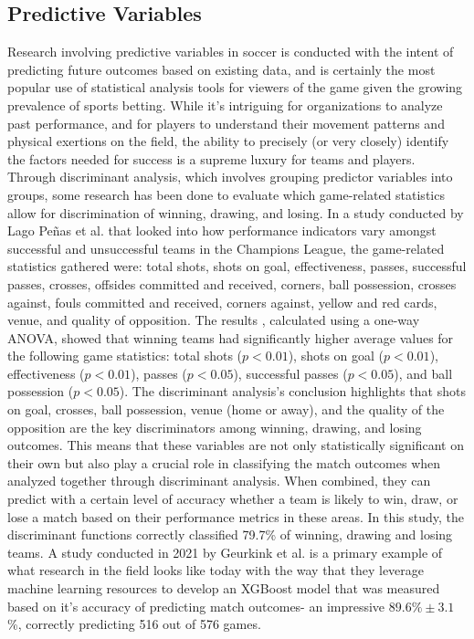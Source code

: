 \subsection{Predictive Variables}

Research involving predictive variables in soccer is conducted with the intent of predicting future outcomes based on existing data, and is certainly the most popular use of statistical analysis tools for viewers of the game given the growing prevalence of sports betting. While it's intriguing for organizations to analyze past performance, and for players to understand their movement patterns and physical exertions on the field, the ability to precisely (or very closely) identify the factors needed for success is a supreme luxury for teams and players. 
Through discriminant analysis, which involves grouping predictor variables into groups, some research has been done to evaluate which game-related statistics allow for discrimination of winning, drawing, and losing. In a study conducted by Lago Peñas et al. that looked into how performance indicators vary amongst successful and unsuccessful teams in the Champions League, the game-related statistics gathered were: total shots, shots on goal, effectiveness, passes, successful passes, crosses, offsides committed and received, corners, ball possession, crosses against, fouls committed and received, corners against, yellow and red cards, venue, and quality of opposition. The results \cite{Lago2011}, calculated using a one-way ANOVA, showed that winning teams had significantly higher average values for the following game statistics: total shots ($p<0.01$), shots on goal ($p<0.01$), effectiveness ($p < 0.01$), passes ($p<0.05$), successful passes ($p<0.05$), and ball possession ($p<0.05$).
The discriminant analysis's conclusion highlights that shots on goal, crosses, ball possession, venue (home or away), and the quality of the opposition are the key discriminators among winning, drawing, and losing outcomes. This means that these variables are not only statistically significant on their own but also play a crucial role in classifying the match outcomes when analyzed together through discriminant analysis. When combined, they can predict with a certain level of accuracy whether a team is likely to win, draw, or lose a match based on their performance metrics in these areas. In this study, the discriminant functions
correctly classified 79.7\% of winning, drawing and losing teams. 
A study conducted in 2021 by Geurkink et al. \cite{Geurkink2021} is a primary example of what research in the field looks like today with the way that they leverage machine learning resources to develop an XGBoost model that was measured based on it's accuracy of predicting match outcomes- an impressive $89.6 \% \pm 3.1$\%, correctly predicting 516 out of 576 games. 

